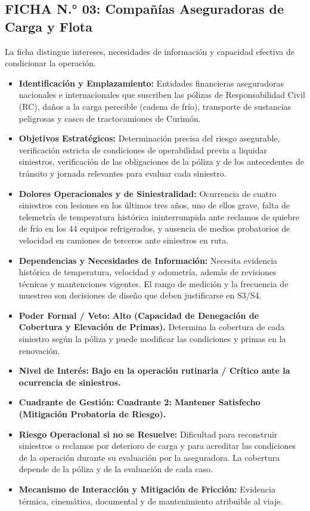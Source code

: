 \subsection*{FICHA N.° 03: Compañías Aseguradoras de Carga y Flota}
La ficha distingue intereses, necesidades de información y capacidad efectiva de condicionar la operación.
\begin{itemize}
\item \textbf{Identificación y Emplazamiento:} Entidades financieras aseguradoras nacionales e internacionales que suscriben las pólizas de Responsabilidad Civil (RC), daños a la carga perecible (cadena de frío), transporte de sustancias peligrosas y casco de tractocamiones de Curimón.
\item \textbf{Objetivos Estratégicos:} Determinación precisa del riesgo asegurable, verificación estricta de condiciones de operabilidad previa a liquidar siniestros, verificación de las obligaciones de la póliza y de los antecedentes de tránsito y jornada relevantes para evaluar cada siniestro.
\item \textbf{Dolores Operacionales y de Siniestralidad:} Ocurrencia de cuatro siniestros con lesiones en los últimos tres años, uno de ellos grave, falta de telemetría de temperatura histórica ininterrumpida ante reclamos de quiebre de frío en los 44 equipos refrigerados, y ausencia de medios probatorios de velocidad en camiones de terceros ante siniestros en ruta.
\item \textbf{Dependencias y Necesidades de Información:} Necesita evidencia histórica de temperatura, velocidad y odometría, además de revisiones técnicas y mantenciones vigentes. El rango de medición y la frecuencia de muestreo son decisiones de diseño que deben justificarse en S3/S4.
\item \textbf{Poder Formal / Veto:} \textbf{Alto (Capacidad de Denegación de Cobertura y Elevación de Primas).} Determina la cobertura de cada siniestro según la póliza y puede modificar las condiciones y primas en la renovación.
\item \textbf{Nivel de Interés:} \textbf{Bajo en la operación rutinaria / Crítico ante la ocurrencia de siniestros.}
\item \textbf{Cuadrante de Gestión:} \textbf{Cuadrante 2: Mantener Satisfecho (Mitigación Probatoria de Riesgo).}
\item \textbf{Riesgo Operacional si no se Resuelve:} Dificultad para reconstruir siniestros o reclamos por deterioro de carga y para acreditar las condiciones de la operación durante su evaluación por la aseguradora. La cobertura depende de la póliza y de la evaluación de cada caso.
\item \textbf{Mecanismo de Interacción y Mitigación de Fricción:} Evidencia térmica, cinemática, documental y de mantenimiento atribuible al viaje.
\end{itemize}

